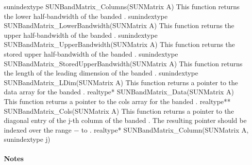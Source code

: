 {
  sunindextype SUNBandMatrix\_Columns(SUNMatrix A)
}
{
  This function returns the lower half-bandwidth of the banded .
}
{
  sunindextype SUNBandMatrix\_LowerBandwidth(SUNMatrix A)
}
{
  This function returns the upper half-bandwidth of the banded .
}
{
  sunindextype SUNBandMatrix\_UpperBandwidth(SUNMatrix A)
}
{
  This function returns the stored upper half-bandwidth of the banded .
}
{
  sunindextype SUNBandMatrix\_StoredUpperBandwidth(SUNMatrix A)
}
{
  This function returns the length of the leading dimension of the banded .
}
{
  sunindextype SUNBandMatrix\_LDim(SUNMatrix A)
}
{
  This function returns a pointer to the data array for the banded .
}
{
  realtype* SUNBandMatrix\_Data(SUNMatrix A)
}
{
  This function returns a pointer to the cols array for the banded .
}
{
  realtype** SUNBandMatrix\_Cols(SUNMatrix A)
}
{
  This function returns a pointer to the diagonal entry of the j-th
  column of the banded .  The resulting pointer should
  be indexed over the range $-$ to .
}
{
  realtype* SUNBandMatrix\_Column(SUNMatrix A, sunindextype j)
}
\paragraph{\bf Notes}

